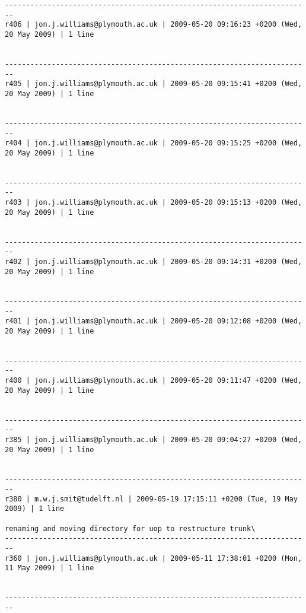 \documentclass[9]{report}
\begin{document}
\begin{description}
\begin{verbatim}
------------------------------------------------------------------------
r406 | jon.j.williams@plymouth.ac.uk | 2009-05-20 09:16:23 +0200 (Wed, 20 May 2009) | 1 line


------------------------------------------------------------------------
r405 | jon.j.williams@plymouth.ac.uk | 2009-05-20 09:15:41 +0200 (Wed, 20 May 2009) | 1 line


------------------------------------------------------------------------
r404 | jon.j.williams@plymouth.ac.uk | 2009-05-20 09:15:25 +0200 (Wed, 20 May 2009) | 1 line


------------------------------------------------------------------------
r403 | jon.j.williams@plymouth.ac.uk | 2009-05-20 09:15:13 +0200 (Wed, 20 May 2009) | 1 line


------------------------------------------------------------------------
r402 | jon.j.williams@plymouth.ac.uk | 2009-05-20 09:14:31 +0200 (Wed, 20 May 2009) | 1 line


------------------------------------------------------------------------
r401 | jon.j.williams@plymouth.ac.uk | 2009-05-20 09:12:08 +0200 (Wed, 20 May 2009) | 1 line


------------------------------------------------------------------------
r400 | jon.j.williams@plymouth.ac.uk | 2009-05-20 09:11:47 +0200 (Wed, 20 May 2009) | 1 line


------------------------------------------------------------------------
r385 | jon.j.williams@plymouth.ac.uk | 2009-05-20 09:04:27 +0200 (Wed, 20 May 2009) | 1 line


------------------------------------------------------------------------
r380 | m.w.j.smit@tudelft.nl | 2009-05-19 17:15:11 +0200 (Tue, 19 May 2009) | 1 line

renaming and moving directory for uop to restructure trunk\
------------------------------------------------------------------------
r360 | jon.j.williams@plymouth.ac.uk | 2009-05-11 17:38:01 +0200 (Mon, 11 May 2009) | 1 line


------------------------------------------------------------------------


\end{verbatim}
\end{description}
\end{document}
